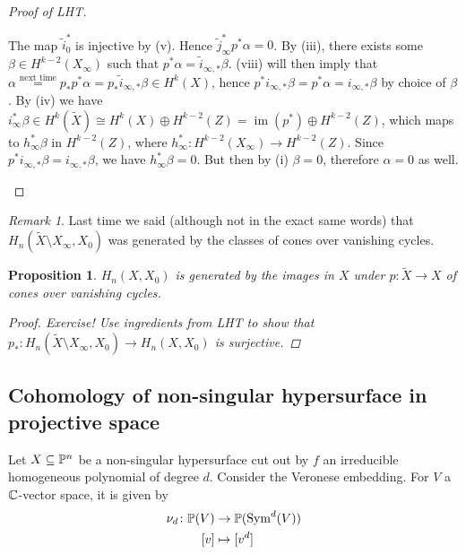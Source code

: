 \documentclass[A4paper, british, reqno]{amsart}
\theoremstyle{darkgreentheorem}
\newtheorem{prop}[thm]{Proposition}
\theoremstyle{darkbluedefinition}
\theoremstyle{darkredexample}
\theoremstyle{remark}
\newtheorem{rem}[thm]{Remark}
\DeclareMathOperator{\im}{im}
\newcommand{\1}{\mathbbm{1}}
\newcommand{\op}{\oplus}
\newcommand{\sub}{\subseteq}
\begin{document}
\begin{proof}[Proof of LHT]
\begin{enumerate}
\begin{center}
	    \end{center}
	    The map $\tilde{i}_{0}^{*}$ is injective by (v).
	    Hence $\tilde{j}_{\infty}^{*}p^{*}\alpha=0$.
	    By (iii), there exists some $\beta \in H^{k-2}(X_{\infty})$ such that $p^{*}\alpha=\tilde{i}_{\infty,*}\beta$.
	    (viii) will then imply that $\alpha\overset{\text{next time}}{=}p_{*}p^{*}\alpha=p_{*}\tilde{i}_{\infty,*}\beta\in H^{k}(X)$, hence $p^{*}i_{\infty,*}\beta =p^{*}\alpha =i_{\infty,*}\beta$ by choice of $\beta$.
	    By (iv) we have $i_{\infty}^{*}\beta \in H^{k}(\tilde{X})\cong H^{k}(X)\op H^{k-2}(Z)=\im(p^{*})\op H^{k-2}(Z)$, which maps to $h_{\infty}^{*}\beta$ in $H^{k-2}(Z)$, where $h_{\infty}^{*}\colon H^{k-2}(X_{\infty})\to H^{k-2}(Z)$.
	    Since $p^{*}i_{\infty,*}\beta = i_{\infty,*}\beta$, we have $h_{\infty}^{*}\beta=0$.
	    But then by (i) $\beta=0$, therefore $\alpha=0$ as well.
    \end{enumerate}
\end{proof}

\begin{rem}
    Last time we said (although not in the exact same words) that $H_{n}(\tilde{X}\setminus X_{\infty},X_{0})$ was generated by the classes of cones over vanishing cycles.
\end{rem}

\begin{prop}
    $H_{n}(X,X_{0})$ is generated by the images in $X$ under $p\colon \tilde{X}\to X$ of cones over vanishing cycles.
    \begin{proof}
	Exercise!
	Use ingredients from LHT to show that $p_{*}\colon H_{n}(\tilde{X}\setminus X_{\infty},X_{0})\to H_{n}(X,X_{0})$ is surjective.
    \end{proof}
\end{prop}

\subsection{Cohomology of non-singular hypersurface in projective space}

Let $X\sub \P^{n}$ be a non-singular hypersurface cut out by $f$ an irreducible homogeneous polynomial of degree $d$.
Consider the Veronese embedding.
For $V$ a $\C$-vector space, it is given by
\begin{align*}
    \nu_{d} \colon \P(V) & \to \P(\operatorname{Sym}^{d}(V)) \\
    [v] & \mapsto [v^{d}]
\end{align*}
\end{document}
